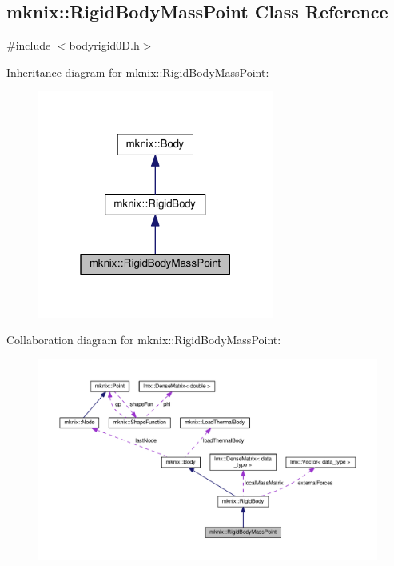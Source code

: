 \hypertarget{classmknix_1_1_rigid_body_mass_point}{}\subsection{mknix\+:\+:Rigid\+Body\+Mass\+Point Class Reference}
\label{classmknix_1_1_rigid_body_mass_point}


{\ttfamily \#include $<$bodyrigid0\+D.\+h$>$}



Inheritance diagram for mknix\+:\+:Rigid\+Body\+Mass\+Point\+:\nopagebreak
\begin{figure}[H]
\begin{center}
\leavevmode
\includegraphics[width=220pt]{d0/d7e/classmknix_1_1_rigid_body_mass_point__inherit__graph}
\end{center}
\end{figure}


Collaboration diagram for mknix\+:\+:Rigid\+Body\+Mass\+Point\+:\nopagebreak
\begin{figure}[H]
\begin{center}
\leavevmode
\includegraphics[width=350pt]{d4/d64/classmknix_1_1_rigid_body_mass_point__coll__graph}
\end{center}
\end{figure}
